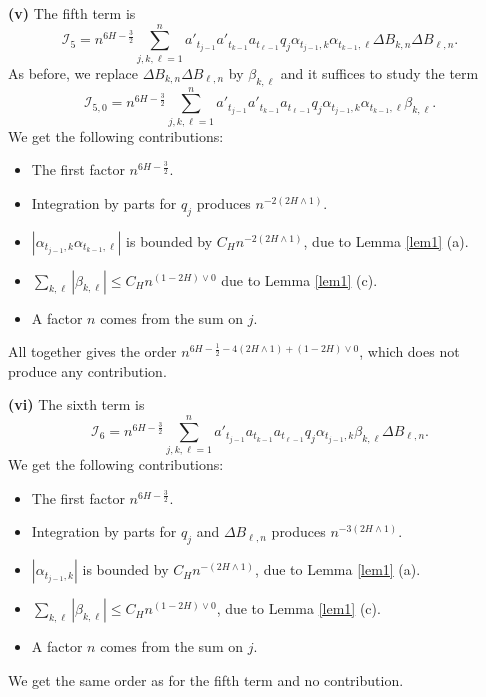 \documentclass[a4paper]{article}
\numberwithin{equation}{section}
\begin{document}
         
         \medskip
         \noindent
         {\bf (v)} The fifth term is
         \[
         \mathcal{I}_5=n^{6H-\frac 32}  \sum_{j,k,\ell=1}^n   a'_{t_{j-1}}a'_{t_{k-1} } a_{t_{\ell-1}}  q_j  \alpha_{t_{j-1},k} \alpha_{t_{k-1},\ell} \Delta B_{k,n} \Delta B_{\ell,n}.
         \]
         As before, we replace $\Delta B_{k,n} \Delta B_{\ell,n}$  by $\beta_{k,\ell}$ and it suffices to study the term
          \[
         \mathcal{I}_{5,0}=n^{6H-\frac 32}  \sum_{j,k,\ell=1}^n   a'_{t_{j-1}}a'_{t_{k-1} } a_{t_{\ell-1}}    q_j \alpha_{t_{j-1},k} \alpha_{t_{k-1},\ell}\beta_{k,\ell}.
                  \]
        We get the following contributions:
        \begin{itemize}
        \item The first factor $n^{6H-\frac 32}$.
        \item Integration by parts for $q_j$ produces $n^{-2(2H\wedge 1)}$.
        \item  $|\alpha_{t_{j-1},k} \alpha_{t_{k-1},\ell}|$ is bounded by $C_H n^{-2(2H\wedge 1)}$, due to Lemma \ref{lem1} (a).
        \item $\sum_{k,\ell} |\beta_{k,\ell}|\le C_H n^{(1-2H)\vee 0}$   due to Lemma \ref{lem1} (c).
        \item A factor $n$ comes from the sum on $j$.
        \end{itemize}
         All together gives the order $n^{6H -\frac 12 -4(2H\wedge 1) +(1-2H)\vee 0}$, which does not produce any contribution.
         
                \medskip
         \noindent
         {\bf (vi)} The  sixth term is
         \[
         \mathcal{I}_6=n^{6H-\frac 32}  \sum_{j,k,\ell=1}^n a'_{t_{j-1}}  a_{t_{k-1}} a_{t_{\ell-1}} q_j \alpha_{t_{j-1},k} \beta_{k,\ell} \Delta B_{\ell,n}.
         \]
                 We get the following contributions:
        \begin{itemize}
        \item The first factor $n^{6H-\frac 32}$.
        \item Integration by parts for $q_j$  and   $\Delta B_{\ell,n}$  produces $n^{-3(2H\wedge 1)}$.
        \item  $|\alpha_{t_{j-1},k}|$  is bounded by $C_H n^{-(2H\wedge 1)}$,  due to Lemma \ref{lem1} (a).
        \item $\sum_{k,\ell} |\beta_{k,\ell}|\le C_H n^{(1-2H)\vee 0}$, due to Lemma \ref{lem1} (c).
        \item A factor $n$ comes from the sum on $j$.
        \end{itemize}
        We get the same order as for the fifth term and no contribution.
        
\end{document}
